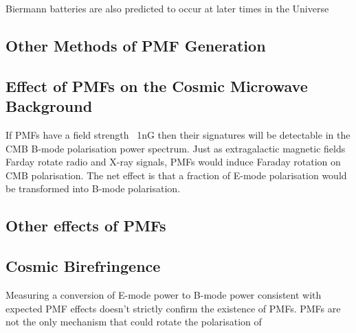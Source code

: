 Biermann batteries are also predicted to occur at later times in the Universe




\subsection{Other Methods of PMF Generation}
\subsection{Effect of PMFs on the Cosmic Microwave Background}
If PMFs have a field strength ~1nG then their signatures will be detectable in the CMB B-mode polarisation power spectrum. Just as extragalactic magnetic fields Farday rotate radio and X-ray signals, PMFs would induce Faraday rotation on CMB polarisation. The net effect is that a fraction of E-mode polarisation would be transformed into B-mode polarisation.
\subsection{Other effects of PMFs}
\subsection{Cosmic Birefringence}
Measuring a conversion of E-mode power to B-mode power consistent with expected PMF effects doesn't strictly confirm the existence of PMFs. PMFs are not the only mechanism that could rotate the polarisation of 



